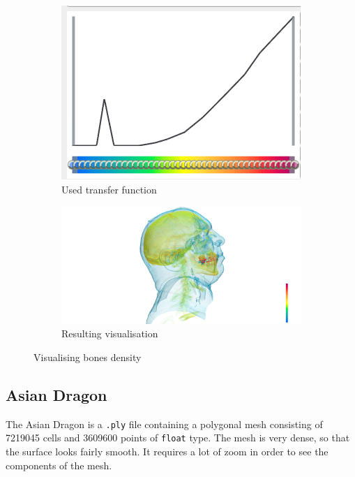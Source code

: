 \documentclass[openany]{article}
\begin{document}
\begin{figure}[h]
\centering
\begin{subfigure}{.4\textwidth}
  \centering
  \includegraphics[width=\linewidth]{VisHuman_Head/transfer_function_2}
  \caption{Used transfer function}
\end{subfigure}%
\begin{subfigure}{.6\textwidth}
  \centering
  \includegraphics[width=\linewidth]{VisHuman_Head/human_head_2}
  \caption{Resulting visualisation}
\end{subfigure}
\caption{Visualising bones density}
\end{figure}

\subsection {Asian Dragon} 

The Asian Dragon is a \texttt{.ply} file containing a polygonal mesh consisting of 7219045 cells and 3609600 points of \texttt{float} type. The mesh is very dense, so that the surface looks fairly smooth. It requires a lot of zoom in order to see the components of the mesh.
\end{document}
